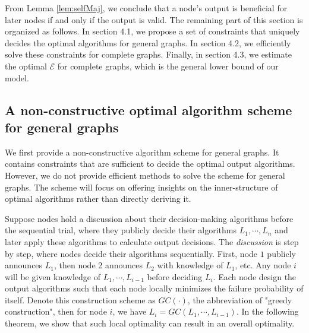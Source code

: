 \documentclass[a4paper,UKenglish]{lipics}
\theoremstyle{definition}
\begin{document}
From Lemma \ref{lem:selfMaj}, we conclude that a node's output is beneficial for later nodes if and only if the output is valid.
The remaining part of this section is organized as follows.
In section 4.1, we propose a set of constraints that uniquely decides the optimal algorithms for general graphs. 
In section 4.2, we efficiently solve these constraints for complete graphs. 
Finally, in section 4.3, we estimate the optimal $\mathcal{E}$ for complete graphs, which is the general lower bound of our model.


\subsection{A non-constructive optimal algorithm scheme for general graphs}
\label{Construction}
We first provide a non-constructive algorithm scheme for general graphs.
It contains constraints that are sufficient to decide the optimal output algorithms.
However, we do not provide efficient methods to solve the scheme for general graphs.
The scheme will focus on offering insights on the inner-structure of optimal algorithms rather than directly deriving it.

Suppose nodes hold a discussion about their decision-making algorithms before the sequential trial, 
	where they publicly decide their algorithms $L_1,\dotsb,L_n$ and later apply these algorithms to calculate output decisions.
The \emph{discussion} is step by step, where nodes decide their algorithms sequentially.
First, node $1$ publicly announces $L_1$, then node 2 announces $L_2$ with knowledge of $L_1$, etc. 
Any node $i$ will be given knowledge of $L_1, \dotsb, L_{i-1}$ before deciding $L_i$.
Each node design the output algorithms such that each node locally minimizes the failure probability of itself.
Denote this construction scheme as $GC(\cdot)$, the abbreviation of "greedy construction",
	then for node $i$, we have $L_i = GC(L_1,\dotsb,L_{i-1})$.
In the following theorem, we show that such local optimality can result in an overall optimality.
\end{document}
